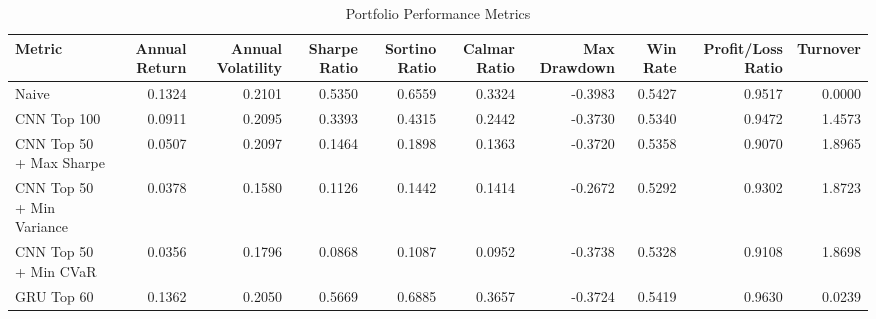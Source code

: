 \begin{table}[htbp]
\centering
\caption{Portfolio Performance Metrics}
\begin{tabular}{lrrrrrrrrr}
\hline
Metric & Annual Return & Annual Volatility & Sharpe Ratio & Sortino Ratio & Calmar Ratio & Max Drawdown & Win Rate & Profit/Loss Ratio & Turnover \\
\hline
Naive & 0.1324 & 0.2101 & 0.5350 & 0.6559 & 0.3324 & -0.3983 & 0.5427 & 0.9517 & 0.0000 \\
CNN Top 100 & 0.0911 & 0.2095 & 0.3393 & 0.4315 & 0.2442 & -0.3730 & 0.5340 & 0.9472 & 1.4573 \\
CNN Top 50 + Max Sharpe & 0.0507 & 0.2097 & 0.1464 & 0.1898 & 0.1363 & -0.3720 & 0.5358 & 0.9070 & 1.8965 \\
CNN Top 50 + Min Variance & 0.0378 & 0.1580 & 0.1126 & 0.1442 & 0.1414 & -0.2672 & 0.5292 & 0.9302 & 1.8723 \\
CNN Top 50 + Min CVaR & 0.0356 & 0.1796 & 0.0868 & 0.1087 & 0.0952 & -0.3738 & 0.5328 & 0.9108 & 1.8698 \\
GRU Top 60 & 0.1362 & 0.2050 & 0.5669 & 0.6885 & 0.3657 & -0.3724 & 0.5419 & 0.9630 & 0.0239 \\
\hline
\end{tabular}
\end{table}